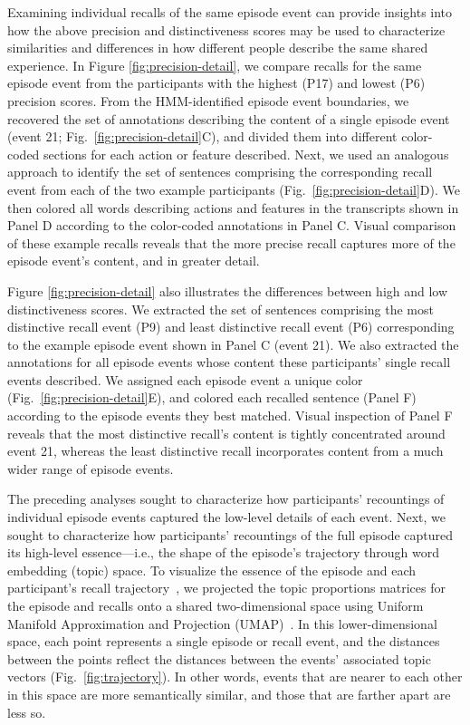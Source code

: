 \documentclass[10pt]{article}
\begin{document}
Examining individual recalls of the same episode event can provide insights into how the above precision and distinctiveness scores may be used to characterize similarities and differences in how different people describe the same shared experience.  In Figure \ref{fig:precision-detail}, we compare recalls for the same episode event from the participants with the highest (P17) and lowest (P6) precision scores.  From the HMM-identified episode event boundaries, we recovered the set of annotations describing the content of a single episode event (event 21; Fig.~\ref{fig:precision-detail}C), and divided them into different color-coded sections for each action or feature described.  Next, we used an analogous approach to identify the set of sentences comprising the corresponding recall event from each of the two example participants (Fig.~\ref{fig:precision-detail}D).  We then colored all words describing actions and features in the transcripts shown in Panel D according to the color-coded annotations in Panel C.  Visual comparison of these example recalls reveals that the more precise recall captures more of the episode event's content, and in greater detail.

Figure \ref{fig:precision-detail} also illustrates the differences between high and low distinctiveness scores.  We extracted the set of sentences comprising the most distinctive recall event (P9) and least distinctive recall event (P6) corresponding to the example episode event shown in Panel C (event 21).  We also extracted the annotations for all episode events whose content these participants' single recall events described.  We assigned each episode event a unique color (Fig.~\ref{fig:precision-detail}E), and colored each recalled sentence (Panel F) according to the episode events they best matched.  Visual inspection of Panel F reveals that the most distinctive recall's content is tightly concentrated around event 21, whereas the least distinctive recall incorporates content from a much wider range of episode events.

The preceding analyses sought to characterize how participants' recountings of individual episode events captured the low-level details of each event.  Next, we sought to characterize how participants' recountings of the full episode captured its high-level essence---i.e., the shape of the episode's trajectory through word embedding (topic) space.  To visualize the essence of the episode and each participant's recall trajectory~\citep{HeusEtal18a}, we projected the topic proportions matrices for the episode and recalls onto a shared two-dimensional space using Uniform Manifold Approximation and Projection (UMAP)~\citep{McInEtal18}.  In this lower-dimensional space, each point represents a single episode or recall event, and the distances between the points reflect the distances between the events' associated topic vectors (Fig.~\ref{fig:trajectory}). In other words, events that are nearer to each other in this space are more semantically similar, and those that are farther apart are less so.
\end{document}
